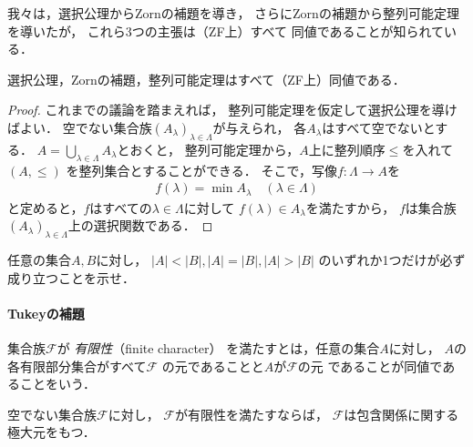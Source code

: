    我々は，選択公理からZornの補題を導き，
   さらにZornの補題から整列可能定理を導いたが，
   これら3つの主張は（ZF上）すべて
   同値であることが知られている．

   \begin{thm} \label{thm:sentakuseiretu}
     選択公理，Zornの補題，整列可能定理はすべて（ZF上）同値である．
   \end{thm}

   \begin{proof}
     これまでの議論を踏まえれば，
     整列可能定理を仮定して選択公理を導けばよい．
     空でない集合族$(A_{\lambda})_{\lambda \in \varLambda}$が与えられ，
     各$A_{\lambda}$はすべて空でないとする．
     $A= \bigcup_{\lambda \in \varLambda} A_{\lambda}$とおくと，
     整列可能定理から，$A$上に整列順序$\leq$を入れて$(A , \leq)$
     を整列集合とすることができる．
     そこで，写像$f: \varLambda \longrightarrow A$を
     \begin{align*}
       f ( \lambda ) = \min A_{\lambda} \quad (\lambda \in \varLambda)
     \end{align*}
     と定めると，$f$はすべての$\lambda \in \varLambda$に対して
     $f ( \lambda ) \in A_{\lambda}$を満たすから，
     $f$は集合族$(A_{\lambda})_{\lambda \in \varLambda}$上の選択関数である．
   \end{proof}


   \begin{que} \label{que:chap4_hikaku}
     任意の集合$A,B$に対し，
     $\lvert A \rvert < \lvert B \rvert ,
     \lvert A \rvert = \lvert B \rvert , 
     \lvert A \rvert > \lvert B \rvert$
     のいずれか1つだけが必ず成り立つことを示せ．
   \end{que}

  \paragraph{Tukeyの補題}
  集合族$\mathscr{F}$が
  \emph{有限性}（finite character）
  を満たすとは，任意の集合$A$に対し，
  $A$の各有限部分集合がすべて$\mathscr{F}$
  の元であることと$A$が$\mathscr{F}$の元
  であることが同値であることをいう．

  \begin{thm}[Tukeyの補題] \label{thm:chap4_tukey}
    空でない集合族$\mathscr{F}$に対し，
    $\mathscr{F}$が有限性を満たすならば，
    $\mathscr{F}$は包含関係に関する極大元をもつ．
  \end{thm}

